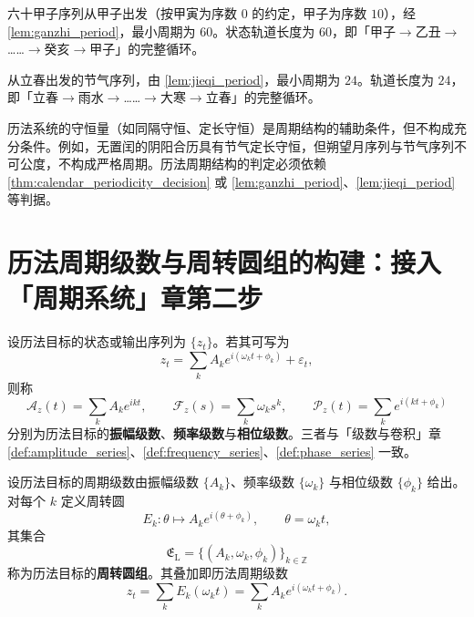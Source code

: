 \begin{example}[干支序列的周期判定实例]\label{ex:calendar_ganzhi_period}
六十甲子序列从甲子出发（按甲寅为序数 \(0\) 的约定，甲子为序数 \(10\)），经 \cref{lem:ganzhi_period}，最小周期为 \(60\)。状态轨道长度为 \(60\)，即「甲子$\to$乙丑$\to$……$\to$癸亥$\to$甲子」的完整循环。
\end{example}

\begin{example}[节气序列的周期判定实例]\label{ex:calendar_jieqi_period}
从立春出发的节气序列，由 \cref{lem:jieqi_period}，最小周期为 \(24\)。轨道长度为 \(24\)，即「立春$\to$雨水$\to$……$\to$大寒$\to$立春」的完整循环。
\end{example}

\begin{remark}[守恒量不保证周期]\label{rem:calendar_invariant_not_period}
历法系统的守恒量（如同隔守恒、定长守恒）是周期结构的辅助条件，但不构成充分条件。例如，无置闰的阴阳合历具有节气定长守恒，但朔望月序列与节气序列不可公度，不构成严格周期。历法周期结构的判定必须依赖 \cref{thm:calendar_periodicity_decision} 或 \cref{lem:ganzhi_period}、\cref{lem:jieqi_period} 等判据。
\end{remark}

\section{历法周期级数与周转圆组的构建：接入「周期系统」章第二步}
\label{sec:calendar_series_construction}

\begin{definition}\label{def:calendar_series}
设历法目标的状态或输出序列为 \(\{z_t\}\)。若其可写为
\[
z_t=\sum_k A_k e^{i(\omega_k t+\phi_k)}+\varepsilon_t,
\]
则称
\[
\mathcal A_z(t)=\sum_k A_k e^{ikt},\qquad
\mathcal F_z(s)=\sum_k \omega_k s^k,\qquad
\mathcal P_z(t)=\sum_k e^{i(kt+\phi_k)}
\]
分别为历法目标的\textbf{振幅级数}、\textbf{频率级数}与\textbf{相位级数}。三者与「级数与卷积」章 \cref{def:amplitude_series}、\cref{def:frequency_series}、\cref{def:phase_series} 一致。
\end{definition}

\begin{definition}[历法周转圆组]\label{def:calendar_epicycle_group}
设历法目标的周期级数由振幅级数 \(\{A_k\}\)、频率级数 \(\{\omega_k\}\) 与相位级数 \(\{\phi_k\}\) 给出。对每个 \(k\) 定义周转圆
\[
E_k:\theta\mapsto A_k e^{i(\theta+\phi_k)},\qquad \theta=\omega_k t,
\]
其集合
\[
\mathfrak E_{\mathrm{L}}=\{(A_k,\omega_k,\phi_k)\}_{k\in\mathbb Z}
\]
称为历法目标的\textbf{周转圆组}。其叠加即历法周期级数
\[
z_t=\sum_k E_k(\omega_k t)=\sum_k A_k e^{i(\omega_k t+\phi_k)}.
\]
\end{definition}

